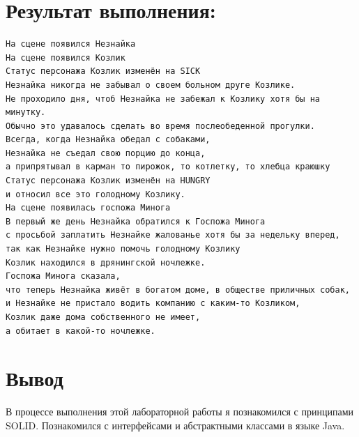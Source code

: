 \documentclass[12pt,onecolumn]{article}
\begin{document}
\section{Результат выполнения:}
\tiny{
\begin{verbatim}
На сцене появился Незнайка
На сцене появился Козлик
Статус персонажа Козлик изменён на SICK
Незнайка никогда не забывал о своем больном друге Козлике.
Не проходило дня, чтоб Незнайка не забежал к Козлику хотя бы на минутку.
Обычно это удавалось сделать во время послеобеденной прогулки.
Всегда, когда Незнайка обедал с собаками,
Незнайка не съедал свою порцию до конца,
а припрятывал в карман то пирожок, то котлетку, то хлебца краюшку
Статус персонажа Козлик изменён на HUNGRY
и относил все это голодному Козлику.
На сцене появилась госпожа Минога
В первый же день Незнайка обратился к Госпожа Минога
с просьбой заплатить Незнайке жалованье хотя бы за недельку вперед,
так как Незнайке нужно помочь голодному Козлику
Козлик находился в дрянингской ночлежке.
Госпожа Минога сказала,
что теперь Незнайка живёт в богатом доме, в обществе приличных собак,
и Незнайке не пристало водить компанию с каким-то Козликом,
Козлик даже дома собственного не имеет,
а обитает в какой-то ночлежке.
\end{verbatim}
}
\section{Вывод}
\normalsize
В процессе выполнения этой лабораторной работы я познакомился с принципами SOLID.
Познакомился с интерфейсами и абстрактными классами в языке Java.
\end{document}
